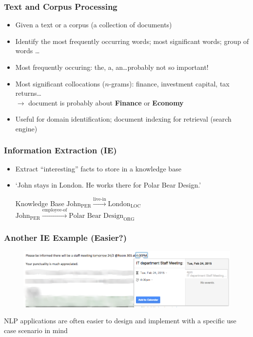 \begin{frame}
\frametitle{Text and Corpus Processing}
    
\begin{itemize}[<+->]
\item Given a text or a corpus (a collection of documents)
\item Identify the most frequently occurring words; most significant words; group of words \ldots
\item Most frequently occuring: the, a, an\ldots probably not so important!
\item Most significant collocations ($n$-grams): finance, investment capital, tax returns\ldots\\
		$\longrightarrow$ document is probably about \textbf{Finance} or \textbf{Economy}
\item Useful for domain identification; document indexing for retrieval (search engine)
\end{itemize}

\end{frame}

\begin{frame}
\frametitle{Information Extraction (IE)} 

\begin{itemize}[<+->]
\item Extract ``interesting'' facts to store in a knowledge base 
\item `John stays in London. He works there for Polar Bear Design.'
	\begin{exampleblock}{Knowledge Base}
	$\text{John}_\text{PER} \xrightarrow{\text{live-in}} \text{London}_\text{LOC}$\\
	$\text{John}_\text{PER} \xrightarrow{\text{employee-of}} \text{Polar Bear Design}_\text{ORG}$
	\end{exampleblock}
\end{itemize}
\end{frame}


\begin{frame}
\frametitle{Another IE Example (Easier?)}
    
\begin{figure}
\centering
\includegraphics[width=\textwidth]{IE-event}
\end{figure}

NLP applications are often easier to design and implement with a specific use case scenario in mind

\end{frame}


